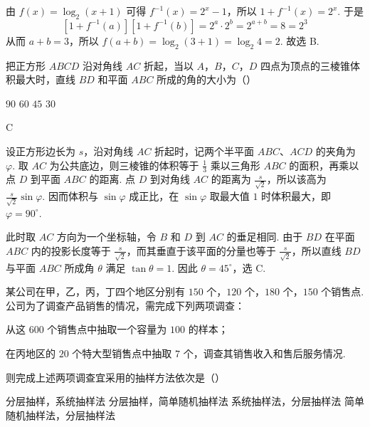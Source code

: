 \begin{solution}
由 \(f(x)=\log_{2}(x+1)\) 可得 \(f^{-1}(x)=2^x-1\)，所以 \(1+f^{-1}(x)=2^x\). 于是
\[
\left[1+f^{-1}(a)\right]\left[1+f^{-1}(b)\right]=2^a\cdot 2^b=2^{a+b}=8=2^3
\]
从而 \(a+b=3\)，所以 \(f(a+b)=\log_{2}(3+1)=\log_{2}4=2\). 故选 B.
\end{solution}

\begin{problem}
把正方形 \(ABCD\) 沿对角线 \(AC\) 折起，当以 \(A\)，\(B\)，\(C\)，\(D\) 四点为顶点的三棱锥体积最大时，直线 \(BD\) 和平面 \(ABC\) 所成的角的大小为（\quad）

\choices
    {\(90\)}
    {\(60\)}
    {\(45\)}
    {\(30\)}
\end{problem}

\begin{answer}
C
\end{answer}

\begin{solution}
设正方形边长为 \(s\)，沿对角线 \(AC\) 折起时，记两个半平面 \(ABC\)、\(ACD\) 的夹角为 \(\varphi\). 取 \(AC\) 为公共底边，则三棱锥的体积等于 \(\frac{1}{3}\) 乘以三角形 \(ABC\) 的面积，再乘以点 \(D\) 到平面 \(ABC\) 的距离. 点 \(D\) 到对角线 \(AC\) 的距离为 \(\frac{s}{\sqrt{2}}\)，所以该高为 \(\frac{s}{\sqrt{2}}\sin\varphi\). 因而体积与 \(\sin\varphi\) 成正比，在 \(\sin\varphi\) 取最大值 \(1\) 时体积最大，即 \(\varphi=90^{\circ}\).

此时取 \(AC\) 方向为一个坐标轴，令 \(B\) 和 \(D\) 到 \(AC\) 的垂足相同. 由于 \(BD\) 在平面 \(ABC\) 内的投影长度等于 \(\frac{s}{\sqrt{2}}\)，而其垂直于该平面的分量也等于 \(\frac{s}{\sqrt{2}}\)，所以直线 \(BD\) 与平面 \(ABC\) 所成角 \(\theta\) 满足 \(\tan\theta=1\). 因此 \(\theta=45^{\circ}\)，选 C.
\end{solution}

\begin{problem}
某公司在甲，乙，丙，丁四个地区分别有 \(150\text{ 个}\)，\(120\text{ 个}\)，\(180\text{ 个}\)，\(150\text{ 个}\)销售点. 公司为了调查产品销售的情况，需完成下列两项调查：

\begin{circlelist}
\item 从这 \(600\text{ 个}\)销售点中抽取一个容量为 \(100\) 的样本；
\item 在丙地区的 \(20\text{ 个}\)特大型销售点中抽取 \(7\text{ 个}\)，调查其销售收入和售后服务情况.
\end{circlelist}

则完成上述两项调查宜采用的抽样方法依次是（\quad）

\choices
    {分层抽样，系统抽样法}
    {分层抽样，简单随机抽样法}
    {系统抽样法，分层抽样法}
    {简单随机抽样法，分层抽样法}
\end{problem}

